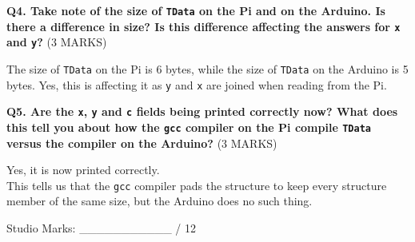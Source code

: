 \documentclass[a4paper,12pt,oneside, tikz]{book}
\begin{document}
\textbf{Q4. Take note of the size of \texttt{TData} on the Pi and on the Arduino. Is there a difference in size? Is this difference affecting the answers for \texttt{x} and \texttt{y}?} (3 MARKS)

\begin{tcolorbox}
The size of \texttt{TData} on the Pi is 6 bytes, while the size of \texttt{TData} on the Arduino is 5 bytes. Yes, this is affecting it as \texttt{y} and \texttt{x} are joined when reading from the Pi.
\end{tcolorbox}

\textbf{Q5. Are the \texttt{x}, \texttt{y} and \texttt{c} fields being printed correctly now? What does this tell you about how the \texttt{gcc} compiler on the Pi compile \texttt{TData} versus the compiler on the Arduino?} (3 MARKS)

\begin{tcolorbox}
Yes, it is now printed correctly. \\

This tells us that the \texttt{gcc} compiler pads the structure to keep every structure member of the same size, but the Arduino does no such thing.



\end{tcolorbox}

\begin{ino}

Studio Marks: ___________ / 12
\end{ino}
\end{document}
